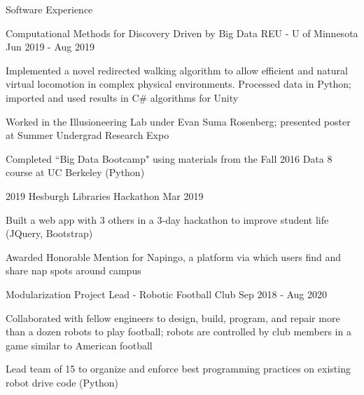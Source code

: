 \documentclass[10pt]{resume} %
\begin{document}
\begin{rSection}{ Software Experience }
\begin{rSubsection}{ Computational Methods for Discovery Driven by Big Data REU - U of Minnesota}{ Jun 2019 - Aug 2019 }{}{}
\item Implemented a novel redirected walking algorithm to allow efficient and natural virtual locomotion in complex physical environments. Processed data in Python; imported and used results in C\# algorithms for Unity
\item Worked in the Illusioneering Lab under Evan Suma Rosenberg; presented poster at Summer Undergrad Research Expo%
\item Completed ``Big Data Bootcamp" using materials from the Fall 2016 Data 8 course at UC Berkeley (Python)
\end{rSubsection}

\begin{rSubsection}{ 2019 Hesburgh Libraries Hackathon }{ Mar 2019 }{}{}
\item Built a web app with 3 others in a 3-day hackathon to improve student life (JQuery, Bootstrap)
\item Awarded Honorable Mention for Napingo, a platform via which users find and share nap spots around campus
\end{rSubsection}

\begin{rSubsection}{ Modularization Project Lead - Robotic Football Club }{ Sep 2018 - Aug 2020 }{}{}
\item Collaborated with fellow engineers to design, build, program, and repair more than a dozen robots to play football; robots are controlled by club members in a game similar to American football
\item Lead team of 15 to organize and enforce best programming practices on existing robot drive code (Python)
\end{rSubsection}

\end{rSection}

\end{document}
